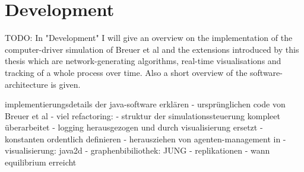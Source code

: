 \documentclass[../Bachelorarbeit.tex]{subfiles}
\begin{document}
\chapter{Development}
TODO:
In "Development" I will give an overview on the implementation of the computer-driver simulation of Breuer et al and the extensions introduced by this thesis which are network-generating algorithms, real-time visualisations and tracking of a whole process over time. Also a short overview of the software-architecture is given.

implementierungsdetails der java-software erklären
- ursprünglichen code von Breuer et al
- viel refactoring:
	- struktur der simulationssteuerung kompleet überarbeitet
	- logging herausgezogen und durch visualisierung ersetzt
	- konstanten ordentlich definieren 
	- herausziehen von agenten-management in 
- visualisierung: java2d
- graphenbibiliothek: JUNG
- replikationen 
- wann equilibrium erreicht
\end{document}
